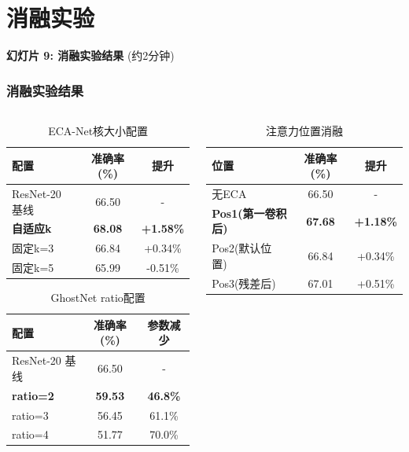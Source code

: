 \documentclass[10pt]{beamer}
\begin{document}
\section{消融实验}
\begin{frame}{\textbf{幻灯片 9: 消融实验结果} (约2分钟)}
\frametitle{消融实验结果}

\begin{columns}[T]
    \begin{column}{0.49\textwidth}
        \begin{table}[h]
        \centering
        {\scriptsize
        \begin{tabular}{|l|c|c|}
        \hline
        配置 & 准确率(\%) & 提升 \\
        \hline
        ResNet-20 基线 & 66.50 & - \\
        \textbf{自适应k} & \textbf{68.08} & \textbf{+1.58\%} \\
        固定k=3 & 66.84 & +0.34\% \\
        固定k=5 & 65.99 & -0.51\% \\
        \hline
        \end{tabular}
        \caption{ECA-Net核大小配置}}
        \end{table}
        
        \vspace{0.5em}
        \begin{table}[h]
        \centering
        {\scriptsize
        \begin{tabular}{|l|c|c|}
        \hline
        配置 & 准确率(\%) & 参数减少 \\
        \hline
        ResNet-20 基线 & 66.50 & - \\
        \textbf{ratio=2} & \textbf{59.53} & \textbf{46.8\%} \\
        ratio=3 & 56.45 & 61.1\% \\
        ratio=4 & 51.77 & 70.0\% \\
        \hline
        \end{tabular}
        \caption{GhostNet ratio配置}}
        \end{table}
    \end{column}
    \begin{column}{0.49\textwidth}
        \begin{table}[h]
        \centering
        {\scriptsize
        \begin{tabular}{|l|c|c|}
        \hline
        位置 & 准确率(\%) & 提升 \\
        \hline
        无ECA & 66.50 & - \\
        \textbf{Pos1(第一卷积后)} & \textbf{67.68} & \textbf{+1.18\%} \\
        Pos2(默认位置) & 66.84 & +0.34\% \\
        Pos3(残差后) & 67.01 & +0.51\% \\
        \hline
        \end{tabular}
        \caption{注意力位置消融}}
        \end{table}
        

\end{column}
\end{columns}
\end{frame}
\end{document}

